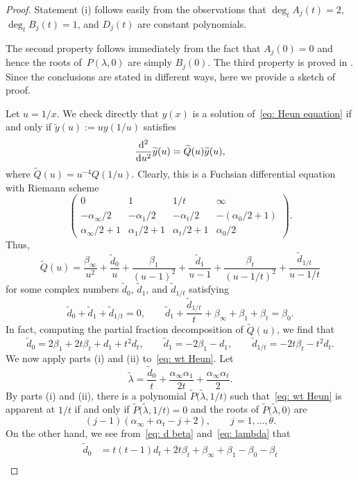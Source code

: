 \documentclass[10pt,a4paper]{amsart}
\numberwithin{equation}{section}
\def\wt#1{\widetilde{#1}}
\begin{document}
\begin{proof}
Statement (i) follows easily from the observations that
 $\deg_t A_j(t)=2$, ${\deg_tB_j(t)=1}$, and $D_j(t)$ are
 constant polynomials.

 The second property follows immediately from the fact that
 $A_j(0)=0$ and hence the roots of~$P(\lambda,0)$ are simply
 $B_j(0)$. The third property is proved in \cite[Theorem~B.3]{Chen-Lin-Yang}. Since the conclusions are stated in different
 ways, here we provide a sketch of proof.

 Let $u=1/x$. We check directly that $y(x)$ is a solution of~\eqref{eq: Heun equation} if and only if $\wt y(u):=uy(1/u)$
 satisfies
 \begin{equation} \label{eq: wt Heun}
 \frac{{\rm d}^2}{{\rm d}u^2}\wt y(u)=\wt Q(u)\wt y(u),
 \end{equation}
 where $\wt Q(u)=u^{-4}Q(1/u)$. Clearly, this is a Fuchsian
 differential equation with Riemann scheme
\[
 \begin{pmatrix}
 0 & 1 & 1/t & \infty \\
 -\alpha_\infty/2 & -\alpha_1/2 & -\alpha_t/2 &
 -(\alpha_0/2+1) \\
 \alpha_\infty/2+1 & \alpha_1/2+1 & \alpha_t/2+1
 & \alpha_0/2 \end{pmatrix}.
\]
 Thus,
\[
 \wt Q(u)=\frac{\beta_\infty}{u^2}+\frac{\wt d_0}u
 +\frac{\beta_1}{(u-1)^2}+\frac{\wt d_1}{u-1}
 +\frac{\beta_t}{(u-1/t)^2}+\frac{\wt d_{1/t}}{u-1/t}
\]
 for some complex numbers $\wt d_0$, $\wt d_1$, and $\wt d_{1/t}$
 satisfying
\[
 \wt d_0+\wt d_1+\wt d_{1/t}=0, \qquad
 \wt d_1+\frac{\wt d_{1/t}}t+\beta_\infty+\beta_1+\beta_t=\beta_0.
\]
In fact, computing the partial fraction decomposition of $\wt Q(u)$,
 we find that
\[
 \wt d_0=2\beta_1+2t\beta_t+d_1+t^2d_t, \qquad
 \wt d_1=-2\beta_1-d_1, \qquad
 \wt d_{1/t}=-2t\beta_t-t^2d_t.
\]
 We now apply parts (i) and (ii) to~\eqref{eq: wt Heun}. Let
\[
 \wt\lambda=\frac{\wt d_0}t+\frac{\alpha_\infty\alpha_1}{2t}
 +\frac{\alpha_\infty\alpha_t}2.
\]
 By parts (i) and (ii), there is a polynomial $\wt P\bigl(\wt\lambda,1/t\bigr)$
 such that~\eqref{eq: wt Heun} is apparent at $1/t$ if and only if
 $\wt P\bigl(\wt\lambda,1/t\bigr)=0$ and the roots of $\wt P\bigl(\wt\lambda,0\bigr)$
 are
\[
 (j-1)(\alpha_\infty+\alpha_t-j+2), \qquad
 j=1,\dots,\theta.
\]
 On the other hand, we see from~\eqref{eq: d beta} and~\eqref{eq: lambda} that
 \begin{align*}\wt d_0
 &{}=t(t-1)d_t+2t\beta_t+\beta_\infty+\beta_1-\beta_0-\beta_t\\

\end{align*}
\end{proof}
\end{document}
